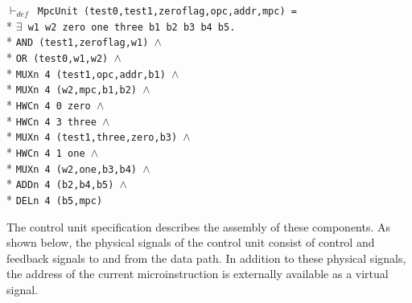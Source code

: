 \begin{normalsize}
\hspace*{\fill}
\begin{minipage}{17cm}
$\vdash_{def}$\verb" MpcUnit (test0,test1,zeroflag,opc,addr,mpc) ="\\*
$\exists$\verb" w1 w2 zero one three b1 b2 b3 b4 b5."\\*
\verb"AND (test1,zeroflag,w1) "$\wedge$\\*
\verb"OR (test0,w1,w2) "$\wedge$\\*
\verb"MUXn 4 (test1,opc,addr,b1) "$\wedge$\\*
\verb"MUXn 4 (w2,mpc,b1,b2) "$\wedge$\\*
\verb"HWCn 4 0 zero "$\wedge$\\*
\verb"HWCn 4 3 three "$\wedge$\\*
\verb"MUXn 4 (test1,three,zero,b3) "$\wedge$\\*
\verb"HWCn 4 1 one "$\wedge$\\*
\verb"MUXn 4 (w2,one,b3,b4) "$\wedge$\\*
\verb"ADDn 4 (b2,b4,b5) "$\wedge$\\*
\verb"DELn 4 (b5,mpc)"
\end{minipage}
\hspace*{\fill}

The control unit specification describes the assembly of these components.
As shown below, the physical signals of the control unit
consist of control and feedback signals to and from the data path.
In addition to these physical signals,
the address of the current microinstruction is externally available
as a virtual signal.


\end{normalsize}

